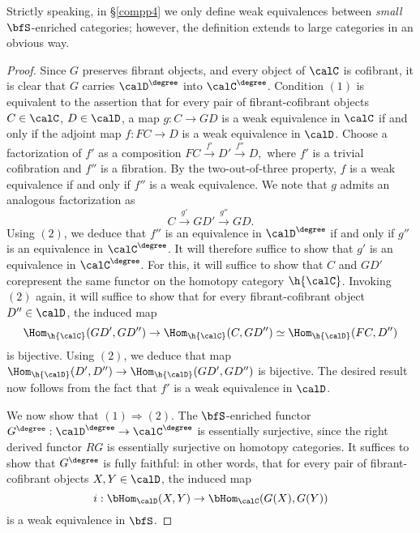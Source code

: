 \begin{Simplicial Categories}
\begin{remark}
Strictly speaking, in \S \ref{compp4} we only define weak equivalences between {\em small} $\bfS$-enriched categories; however, the definition extends to large categories in an obvious way.
\end{remark}

\begin{proof}
Since $G$ preserves fibrant objects, and every object of $\calC$ is cofibrant, it is clear that
$G$ carries $\calD^{\degree}$ into $\calC^{\degree}$. Condition $(1)$
is equivalent to the assertion that for every pair of fibrant-cofibrant objects
$C \in \calC$, $D \in \calD$, a map
$g: C \rightarrow GD$ is a weak equivalence in $\calC$ if and only if the adjoint map
$f: FC \rightarrow D$ is a weak equivalence in $\calD$. Choose a factorization of $f'$ as a composition
$FC \stackrel{f'}{\rightarrow} D' \stackrel{f''}{\rightarrow} D,$
where $f'$ is a trivial cofibration and $f''$ is a fibration. By the two-out-of-three property,
$f$ is a weak equivalence if and only if $f''$ is a weak equivalence. We note that
$g$ admits an analogous factorization as
$$ C \stackrel{g'}{\rightarrow} GD' \stackrel{g''}{\rightarrow} GD.$$
Using $(2)$, we deduce that $f''$ is an equivalence in $\calD^{\degree}$ if and only if
$g''$ is an equivalence in $\calC^{\degree}$. It will therefore suffice to show that
$g'$ is an equivalence in $\calC^{\degree}$. For this, it will suffice to show that
$C$ and $GD'$ corepresent the same functor on the homotopy category $\h{\calC}$.
Invoking $(2)$ again, it will suffice to show that for every fibrant-cofibrant object
$D'' \in \calD$, the induced map
$$\Hom_{ \h{\calC} }( GD', GD'') \rightarrow \Hom_{\h{\calC}}( C, GD'')
\simeq \Hom_{\h{\calD}}( FC, D'')$$ is bijective. Using $(2)$, 
we deduce that map $\Hom_{\h{\calD}}(D',D'') \rightarrow \Hom_{\h{\calD}}( GD', GD'')$
is bijective. The desired result now follows from the fact that $f'$ is a weak equivalence in $\calD$.

We now show that $(1) \Rightarrow (2)$.
The $\bfS$-enriched functor $G^{\degree}: \calD^{\degree} \rightarrow \calC^{\degree}$ is essentially surjective, since the right derived functor $RG$ is essentially surjective on homotopy categories. It suffices to show that $G^{\degree}$ is fully faithful: in other words, that for every pair of fibrant-cofibrant objects $X,Y \in \calD$, the induced map
$$ i: \bHom_{\calD}(X,Y) \rightarrow \bHom_{\calC}(G(X),G(Y))$$ 
is a weak equivalence in $\bfS$.


\end{proof}
\end{Simplicial Categories}
